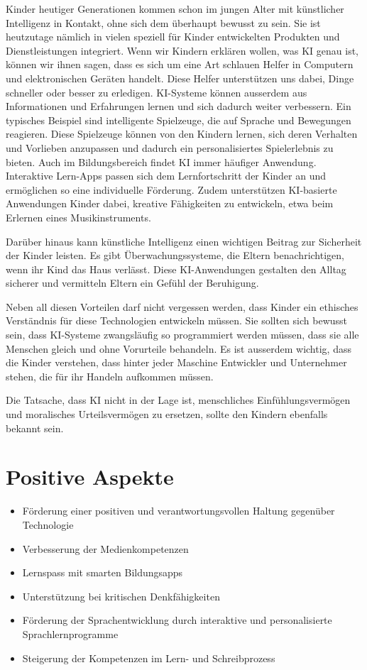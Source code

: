 \documentclass{report}
\begin{document}
Kinder heutiger Generationen kommen schon im jungen Alter mit künstlicher Intelligenz in Kontakt, ohne sich dem überhaupt bewusst zu sein. Sie ist heutzutage nämlich in vielen speziell für Kinder entwickelten Produkten und Dienstleistungen integriert. Wenn wir Kindern erklären wollen, was KI genau ist, können wir ihnen sagen, dass es sich um eine Art schlauen Helfer in Computern und elektronischen Geräten handelt. Diese Helfer unterstützen uns dabei, Dinge schneller oder besser zu erledigen. KI-Systeme können ausserdem aus Informationen und Erfahrungen lernen und sich dadurch weiter verbessern.
Ein typisches Beispiel sind intelligente Spielzeuge, die auf Sprache und Bewegungen reagieren. Diese Spielzeuge können von den Kindern lernen, sich deren Verhalten und Vorlieben anzupassen und dadurch ein personalisiertes Spielerlebnis zu bieten.
Auch im Bildungsbereich findet KI immer häufiger Anwendung. Interaktive Lern-Apps passen sich dem Lernfortschritt der Kinder an und ermöglichen so eine individuelle Förderung. Zudem unterstützen KI-basierte Anwendungen Kinder dabei, kreative Fähigkeiten zu entwickeln, etwa beim Erlernen eines Musikinstruments.

Darüber hinaus kann künstliche Intelligenz einen wichtigen Beitrag zur Sicherheit der Kinder leisten. Es gibt Überwachungssysteme, die Eltern benachrichtigen, wenn ihr Kind das Haus verlässt. Diese KI-Anwendungen gestalten den Alltag sicherer und vermitteln Eltern ein Gefühl der Beruhigung. 

Neben all diesen Vorteilen darf nicht vergessen werden, dass Kinder ein ethisches Verständnis für diese Technologien entwickeln müssen. Sie sollten sich bewusst sein, dass KI-Systeme zwangsläufig so programmiert werden müssen, dass sie alle Menschen gleich und ohne Vorurteile behandeln. Es ist ausserdem wichtig, dass die Kinder verstehen, dass hinter jeder Maschine Entwickler und Unternehmer stehen, die für ihr Handeln aufkommen müssen.

Die Tatsache, dass KI nicht in der Lage ist, menschliches Einfühlungsvermögen und moralisches Urteilsvermögen zu ersetzen, sollte den Kindern ebenfalls bekannt sein. 

\section{Positive Aspekte}

\begin{itemize}

    \item Förderung einer positiven und verantwortungsvollen Haltung gegenüber Technologie
    \item Verbesserung der Medienkompetenzen
    \item Lernspass mit smarten Bildungsapps
    \item Unterstützung bei kritischen Denkfähigkeiten
    \item Förderung der Sprachentwicklung durch interaktive und personalisierte Sprachlernprogramme
    \item Steigerung der Kompetenzen im Lern- und Schreibprozess

\end{itemize}
\end{document}
